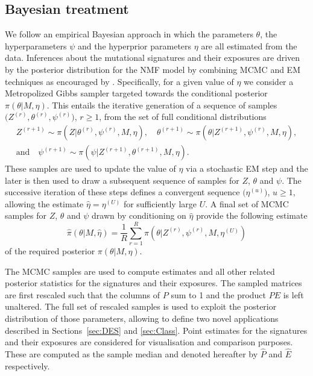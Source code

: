 \documentclass{bioinfo}
\begin{document}
\subsection{Bayesian treatment}
We follow an empirical Bayesian approach in which the parameters
$\theta$, the hyperparameters $\psi$ and the hyperprior parameters
$\eta$ are all estimated from the data.  Inferences about the
mutational signatures and their exposures are driven by the posterior
distribution for the NMF model by combining MCMC and EM techniques as
encouraged by \cite{C01}. Specifically, for a given value of $\eta$ we
consider a Metropolized Gibbs sampler targeted towards the conditional
posterior $\pi(\theta|M, \eta)$. This entails the iterative generation
of a sequence of samples $\big(Z^{(r)}, \theta^{(r)},
\psi^{(r)}\big)$, $r \geq 1$, from the set of full conditional
distributions
\begin{gather*}
   Z^{(r+1)} \sim \pi(Z| \theta^{(r)}, \psi^{(r)}, M, \eta), \quad
   \theta^{(r+1)} \sim \pi(\theta| Z^{(r+1)}, \psi^{(r)}, M, \eta), \\
       \text{and}\quad
   \psi^{(r+1)} \sim \pi(\psi| Z^{(r+1)}, \theta^{(r+1)}, M, \eta).
\end{gather*}
These samples are used to update the value of $\eta$ via a stochastic
EM step and the later is then used to draw a subsequent sequence of
samples for $Z$, $\theta$ and $\psi$. The successive iteration of
these steps defines a convergent sequence $\big(\eta^{(u)}\big)$, $u
\geq 1$, allowing the estimate $\hat\eta = \eta^{(U)}$ for
sufficiently large $U$. A final set of MCMC samples for $Z$, $\theta$
and $\psi$ drawn by conditioning on $\hat\eta$ provide the following
estimate
\begin{equation}
 \label{eqn:MCEM_estimate}
   \widehat{\pi}(\theta|M, \hat\eta)
 = 
   \frac{1}{R}\sum_{r=1}^R \pi(\theta|Z^{(r)}, \psi^{(r)}, M,
   \eta^{(U)})
\end{equation}
of the required posterior $\pi(\theta|M, \eta)$.

The MCMC samples are used to compute estimates and all other related
posterior statistics for the signatures and their exposures. The
sampled matrices are first rescaled such that the columns of $P$ sum
to 1 and the product $PE$ is left unaltered. The full set of rescaled 
samples is used to exploit the posterior distribution of those
parameters, allowing to define two novel applications described in
Sections~\ref{sec:DES} and \ref{sec:Class}.  Point
estimates for the signatures and their exposures are considered for
visualisation and comparison purposes. These are computed as the
sample median and denoted hereafter by $\widehat P$ and $\widehat E$
respectively.
\end{document}
